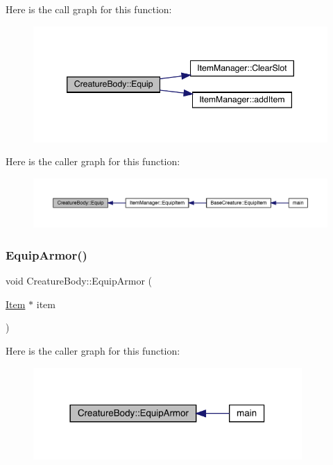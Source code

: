 Here is the call graph for this function\+:
\nopagebreak
\begin{figure}[H]
\begin{center}
\leavevmode
\includegraphics[width=346pt]{da/d7d/class_creature_body_a8a55f2c0785aaf956cdee04a538dfb97_cgraph}
\end{center}
\end{figure}
Here is the caller graph for this function\+:
\nopagebreak
\begin{figure}[H]
\begin{center}
\leavevmode
\includegraphics[width=350pt]{da/d7d/class_creature_body_a8a55f2c0785aaf956cdee04a538dfb97_icgraph}
\end{center}
\end{figure}
\mbox{\label{class_creature_body_a5a14d8decef3d1051ac7e9d79a1a4b72}} 
\subsubsection{\texorpdfstring{Equip\+Armor()}{EquipArmor()}}
{\footnotesize\ttfamily void Creature\+Body\+::\+Equip\+Armor (\begin{DoxyParamCaption}\item[{\mbox{\hyperlink{class_item}{Item}} $\ast$}]{item }\end{DoxyParamCaption})}

Here is the caller graph for this function\+:
\nopagebreak
\begin{figure}[H]
\begin{center}
\leavevmode
\includegraphics[width=290pt]{da/d7d/class_creature_body_a5a14d8decef3d1051ac7e9d79a1a4b72_icgraph}
\end{center}
\end{figure}
\mbox{\label{class_creature_body_af329b825db569100370683f7a9b0263c}} 
